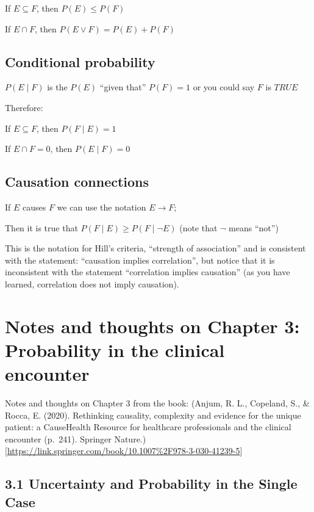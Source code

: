 \documentclass[
]{book}
\begin{document}
If \(E \subseteq F\), then \(P(E) \le P(F)\)

If \(E \cap F\), then \(P(E \lor F) = P(E)+P(F)\)

\hypertarget{conditional-probability}{%
\subsection{Conditional probability}\label{conditional-probability}}

\(P(E \mid F)\) is the \(P(E)\) ``given that'' \(P(F) = 1\) or you could say \(F\) is \(TRUE\)

Therefore:

If \(E \subseteq F\), then \(P(F \mid E) = 1\)

If \(E \cap F = 0\), then \(P(E \mid F) = 0\)

\hypertarget{causation-connections}{%
\subsection{Causation connections}\label{causation-connections}}

If \(E\) causes \(F\) we can use the notation \(E \rightarrow F\);

Then it is true that \(P(F \mid E) \ge P(F \mid \neg E)\) (note that \(\neg\) means ``not'')

This is the notation for Hill's criteria, ``strength of association'' and is consistent with the statement: ``causation implies correlation'', but notice that it is inconsistent with the statement ``correlation implies causation'' (as you have learned, correlation does not imply causation).

\hypertarget{notes-and-thoughts-on-chapter-3-probability-in-the-clinical-encounter}{%
\section{Notes and thoughts on Chapter 3: Probability in the clinical encounter}\label{notes-and-thoughts-on-chapter-3-probability-in-the-clinical-encounter}}

Notes and thoughts on Chapter 3 from the book: (Anjum, R. L., Copeland, S., \& Rocca, E. (2020). Rethinking causality, complexity and evidence for the unique patient: a CauseHealth Resource for healthcare professionals and the clinical encounter (p.~241). Springer Nature.){[}\url{https://link.springer.com/book/10.1007\%2F978-3-030-41239-5}{]}

\hypertarget{uncertainty-and-probability-in-the-single-case}{%
\subsection{3.1 Uncertainty and Probability in the Single Case}\label{uncertainty-and-probability-in-the-single-case}}
\end{document}
